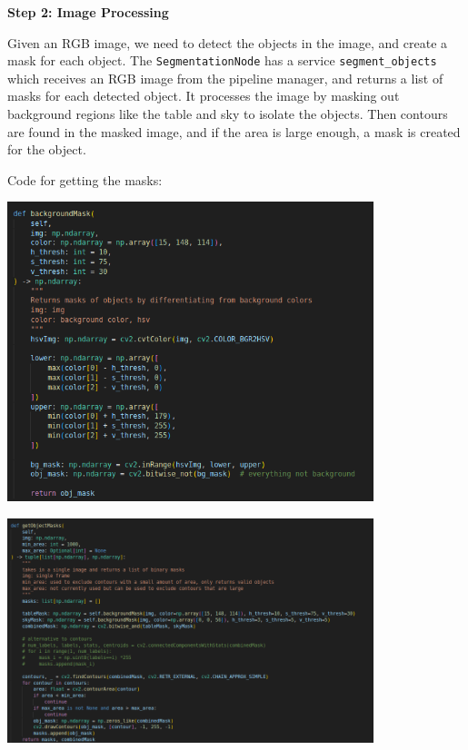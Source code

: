 \documentclass[12pt]{article}
\begin{document}
\textbf{Step 2: Image Processing}

Given an RGB image, we need to detect the objects in the image, and create a mask for each object. The \texttt{SegmentationNode} has a service \texttt{segment\_objects} which receives an RGB image from the pipeline manager, and returns a list of masks for each detected object. It processes the image by masking out background regions like the table and sky to isolate the objects. Then contours are found in the masked image, and if the area is large enough, a mask is created for the object. 

Code for getting the masks:

\begin{center}
	\includegraphics[width=0.8\textwidth]{vision/backgroudmask.png}
\end{center}

\begin{center}
	\includegraphics[width=0.8\textwidth]{vision/getobjectmasks.png}
\end{center}
\end{document}
